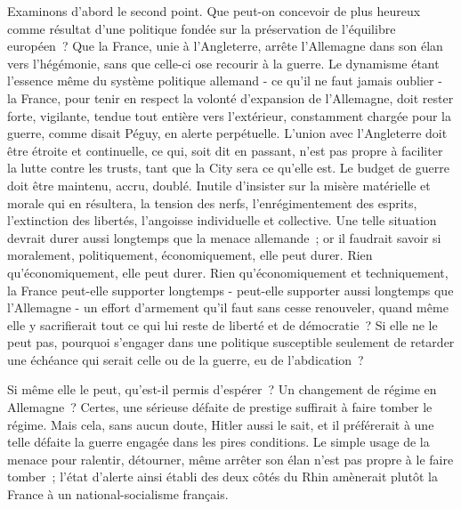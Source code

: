 \documentclass[french,twoside]{book} %
\begin{document}
Examinons d'abord le second point. Que peut-on concevoir de plus heureux comme résultat d'une politique fondée sur la préservation de l'équilibre européen ? Que la France, unie à l'Angleterre, arrête l'Allemagne dans son élan vers l'hégémonie, sans que celle-ci ose recourir à la guerre. Le dynamisme étant l'essence même du système politique allemand - ce qu'il ne faut jamais oublier - la France, pour tenir en respect la volonté d'expansion de l'Allemagne, doit rester forte, vigilante, tendue tout entière vers l'extérieur, constamment chargée pour la guerre, comme disait Péguy, en alerte perpétuelle. L'union avec l'Angleterre doit être étroite et continuelle, ce qui, soit dit en passant, n'est pas propre à faciliter la lutte contre les trusts, tant que la City sera ce qu'elle est. Le budget de guerre doit être maintenu, accru, doublé. Inutile d'insister sur la misère matérielle et morale qui en résultera, la tension des nerfs, l'enrégimentement des esprits, l'extinction des libertés, l'angoisse individuelle et collective. Une telle situation devrait durer aussi longtemps que la menace allemande ; or il faudrait savoir si moralement, politiquement, économiquement, elle peut durer. Rien qu'économiquement, elle peut durer. Rien qu'économiquement et techniquement, la France peut-elle supporter longtemps - peut-elle supporter aussi longtemps que l'Allemagne - un effort d'armement qu'il faut sans cesse renouveler, quand même elle y sacrifierait tout ce qui lui reste de liberté et de démocratie ? Si elle ne le peut pas, pourquoi s'engager dans une politique susceptible seulement de retarder une échéance qui serait celle ou de la guerre, eu de l'abdication ?\par
Si même elle le peut, qu'est-il permis d'espérer ? Un changement de régime en Allemagne ? Certes, une sérieuse défaite de prestige suffirait à faire tomber le régime. Mais cela, sans aucun doute, Hitler aussi le sait, et il préférerait à une telle défaite la guerre engagée dans les pires conditions. Le simple usage de la menace pour ralentir, détourner, même arrêter son élan n'est pas propre à le faire tomber ; l'état d'alerte ainsi établi des deux côtés du Rhin amènerait plutôt la France à un national-socialisme français.\par
\end{document}

